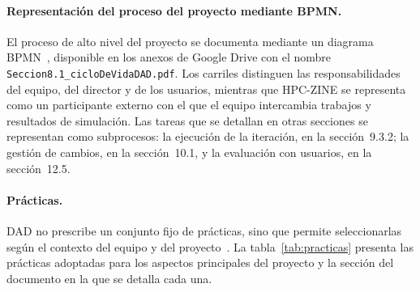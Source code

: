 \paragraph{Representación del proceso del proyecto mediante BPMN.}
El proceso de alto nivel del proyecto se documenta mediante un diagrama BPMN~\cite{omg2013bpmn}, disponible en los anexos de Google Drive con el nombre \texttt{Seccion8.1\_cicloDeVidaDAD.pdf}. Los carriles distinguen las responsabilidades del equipo, del director y de los usuarios, mientras que HPC-ZINE se representa como un participante externo con el que el equipo intercambia trabajos y resultados de simulación. Las tareas que se detallan en otras secciones se representan como subprocesos: la ejecución de la iteración, en la sección~9.3.2; la gestión de cambios, en la sección~10.1, y la evaluación con usuarios, en la sección~12.5.

\paragraph{Prácticas.}
DAD no prescribe un conjunto fijo de prácticas, sino que permite seleccionarlas según el contexto del equipo y del proyecto~\cite{ambler2012dad}. La tabla~\ref{tab:practicas} presenta las prácticas adoptadas para los aspectos principales del proyecto y la sección del documento en la que se detalla cada una.

